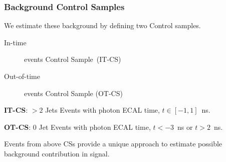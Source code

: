 \documentclass{beamer}
\begin{document}
\begin{frame}
\frametitle{Background Control Samples}
We estimate these background by defining two Control samples.
\begin{flushleft}
 \begin{description}
   \item[In-time] events Control Sample~(IT-CS)
   \item[Out-of-time] events Control Sample (OT-CS)
 \end{description} 
 \end{flushleft}
\begin{tcolorbox}[colback=UNL@Cream!5,colframe=UMN@Maroon!40,title=\textcolor{UMN@Gold}{\textbf{Control Sample (In-time Events)}}]
\textbf{IT-CS}: $> 2$ Jets Events with photon ECAL time, $t \in [-1, 1]$~ns.
\end{tcolorbox}

\begin{tcolorbox}[colback=UNL@Cream!5,colframe=UMN@Maroon!40,title=\textcolor{UMN@Gold}{\textbf{Control Sample (Out-Of-time Events)}}]
\textbf{OT-CS}: $0$ Jet Events with photon ECAL time, $ t < -3$~ns or $t > 2$~ns.
\end{tcolorbox}
 
 \begin{minipage}[t]{0.8\linewidth}
 Events from above CSs provide a unique approach to estimate possible background contribution in signal.
 \end{minipage}
\end{frame}
\end{document}
